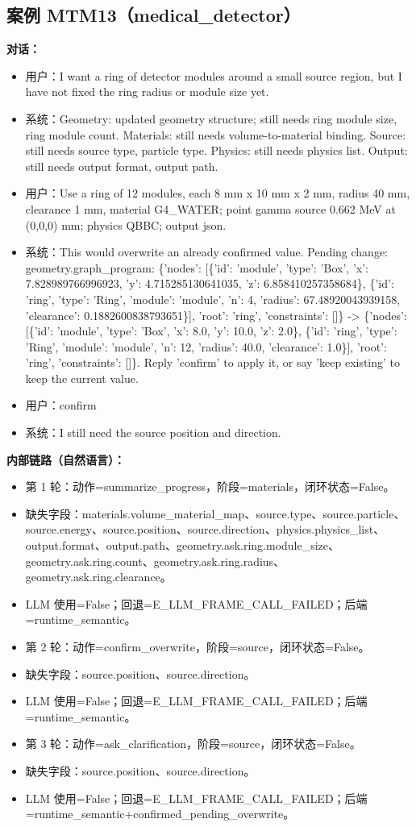 \documentclass[11pt]{ctexart}
\begin{document}
\subsection{案例 MTM13（medical\_detector）}
\textbf{对话：}
\begin{itemize}
\item 用户：I want a ring of detector modules around a small source region, but I have not fixed the ring radius or module size yet.
\item 系统：Geometry: updated geometry structure; still needs ring module size, ring module count. Materials: still needs volume-to-material binding. Source: still needs source type, particle type. Physics: still needs physics list. Output: still needs output format, output path.
\item 用户：Use a ring of 12 modules, each 8 mm x 10 mm x 2 mm, radius 40 mm, clearance 1 mm, material G4\_WATER; point gamma source 0.662 MeV at (0,0,0) mm; physics QBBC; output json.
\item 系统：This would overwrite an already confirmed value. Pending change: geometry.graph\_program: \{'nodes': [\{'id': 'module', 'type': 'Box', 'x': 7.828989766996923, 'y': 4.715285130641035, 'z': 6.858410257358684\}, \{'id': 'ring', 'type': 'Ring', 'module': 'module', 'n': 4, 'radius': 67.48920043939158, 'clearance': 0.1882600838793651\}], 'root': 'ring', 'constraints': []\} -> \{'nodes': [\{'id': 'module', 'type': 'Box', 'x': 8.0, 'y': 10.0, 'z': 2.0\}, \{'id': 'ring', 'type': 'Ring', 'module': 'module', 'n': 12, 'radius': 40.0, 'clearance': 1.0\}], 'root': 'ring', 'constraints': []\}. Reply 'confirm' to apply it, or say 'keep existing' to keep the current value.
\item 用户：confirm
\item 系统：I still need the source position and direction.
\end{itemize}
\textbf{内部链路（自然语言）：}
\begin{itemize}
\item 第 1 轮：动作=summarize\_progress，阶段=materials，闭环状态=False。
\item 缺失字段：materials.volume\_material\_map、source.type、source.particle、source.energy、source.position、source.direction、physics.physics\_list、output.format、output.path、geometry.ask.ring.module\_size、geometry.ask.ring.count、geometry.ask.ring.radius、geometry.ask.ring.clearance。
\item LLM 使用=False；回退=E\_LLM\_FRAME\_CALL\_FAILED；后端=runtime\_semantic。
\item 第 2 轮：动作=confirm\_overwrite，阶段=source，闭环状态=False。
\item 缺失字段：source.position、source.direction。
\item LLM 使用=False；回退=E\_LLM\_FRAME\_CALL\_FAILED；后端=runtime\_semantic。
\item 第 3 轮：动作=ask\_clarification，阶段=source，闭环状态=False。
\item 缺失字段：source.position、source.direction。
\item LLM 使用=False；回退=E\_LLM\_FRAME\_CALL\_FAILED；后端=runtime\_semantic+confirmed\_pending\_overwrite。
\end{itemize}
\end{document}

